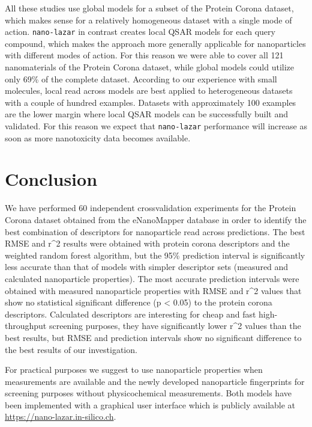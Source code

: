 \documentclass[utf8]{frontiersHLTH} %
\begin{document}
All these studies use global models for a subset of the Protein Corona
dataset, which makes sense for a relatively homogeneous dataset with a
single mode of action. \texttt{nano-lazar} in contrast creates local
QSAR models for each query compound, which makes the approach more
generally applicable for nanoparticles with different modes of action.
For this reason we were able to cover all 121 nanomaterials of the
Protein Corona dataset, while global models could utilize only 69\% of
the complete dataset. According to our experience with small molecules,
local read across models are best applied to heterogeneous datasets with
a couple of hundred examples. Datasets with approximately 100 examples
are the lower margin where local QSAR models can be successfully built
and validated. For this reason we expect that \texttt{nano-lazar}
performance will increase as soon as more nanotoxicity data becomes
available.

\section{Conclusion}\label{conclusion}

We have performed 60 independent crossvalidation experiments for the
Protein Corona dataset obtained from the eNanoMapper database in order
to identify the best combination of descriptors for nanoparticle read
across predictions. The best RMSE and r\^{}2 results were obtained with
protein corona descriptors and the weighted random forest algorithm, but
the 95\% prediction interval is significantly less accurate than that of
models with simpler descriptor sets (measured and calculated
nanoparticle properties). The most accurate prediction intervals were
obtained with measured nanoparticle properties with RMSE and r\^{}2
values that show no statistical significant difference (p \textless{}
0.05) to the protein corona descriptors. Calculated descriptors are
interesting for cheap and fast high-throughput screening purposes, they
have significantly lower r\^{}2 values than the best results, but RMSE
and prediction intervals show no significant difference to the best
results of our investigation.

For practical purposes we suggest to use nanoparticle properties when
measurements are available and the newly developed nanoparticle
fingerprints for screening purposes without physicochemical
measurements. Both models have been implemented with a graphical user
interface which is publicly available at
\url{https://nano-lazar.in-silico.ch}.
\end{document}

